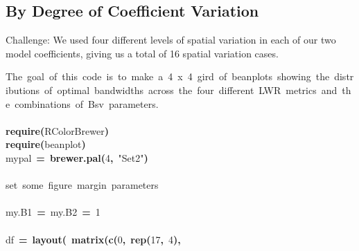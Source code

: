 \documentclass{article}
\makeatletter
\newcommand{\hlnumber}[1]{\textcolor[rgb]{0,0,0}{#1}}%
\newcommand{\hlfunctioncall}[1]{\textcolor[rgb]{0.501960784313725,0,0.329411764705882}{\textbf{#1}}}%
\newcommand{\hlstring}[1]{\textcolor[rgb]{0.6,0.6,1}{#1}}%
\newcommand{\hlkeyword}[1]{\textcolor[rgb]{0,0,0}{\textbf{#1}}}%
\newcommand{\hlcomment}[1]{\textcolor[rgb]{0.180392156862745,0.6,0.341176470588235}{#1}}%
\newcommand{\hlassignement}[1]{\textcolor[rgb]{0,0,0}{\textbf{#1}}}%
\newcommand{\hlsymbol}[1]{\textcolor[rgb]{0,0,0}{#1}}%
\newcommand{\hlstd}[1]{\textcolor[rgb]{0,0,0}{#1}}%
\newenvironment{kframe}{%
 \def\FrameCommand##1{\hskip\@totalleftmargin \hskip-\fboxsep
 \colorbox{shadecolor}{##1}\hskip-\fboxsep
     \hskip-\linewidth \hskip-\@totalleftmargin \hskip\columnwidth}%
 \MakeFramed {\advance\hsize-\width
   \@totalleftmargin\z@ \linewidth\hsize
   \@setminipage}}%
 {\par\unskip\endMakeFramed}
\newenvironment{knitrout}{}{} %
\makeatother
\begin{document}
\subsection{By Degree of Coefficient Variation}

Challenge: We used four different levels of spatial variation in each of our two model coefficients, giving us a total of 16 spatial variation cases.

\begin{knitrout}
\color{fgcolor}\begin{kframe}
\begin{flushleft}
\ttfamily\noindent
\hlcomment{\usebox{\hlnormalsizeboxhash}{\ }The{\ }goal{\ }of{\ }this{\ }code{\ }is{\ }to{\ }make{\ }a{\ }4{\ }x{\ }4{\ }gird{\ }of{\ }beanplots{\ }showing{\ }the{\ }distributions{\ }of{\ }optimal{\ }bandwidths{\ }across{\ }the{\ }four{\ }different{\ }LWR{\ }metrics{\ }and{\ }the{\ }combinations{\ }of{\ }Bsv{\ }parameters.{\ }}\hspace*{\fill}\\
\hlstd{}\hspace*{\fill}\\
\hlstd{}\hlfunctioncall{require}\hlkeyword{(}\hlsymbol{RColorBrewer}\hlkeyword{)}\hspace*{\fill}\\
\hlstd{}\hlfunctioncall{require}\hlkeyword{(}\hlsymbol{beanplot}\hlkeyword{)}\hspace*{\fill}\\
\hlstd{}\hlsymbol{mypal}{\ }\hlassignement{=}{\ }\hlfunctioncall{brewer.pal}\hlkeyword{(}\hlnumber{4}\hlkeyword{,}{\ }\hlstring{"{}Set2"{}}\hlkeyword{)}\hspace*{\fill}\\
\hlstd{}\hspace*{\fill}\\
\hlstd{}\hlcomment{\usebox{\hlnormalsizeboxhash}{\ }set{\ }some{\ }figure{\ }margin{\ }parameters}\hspace*{\fill}\\
\hlstd{}\hspace*{\fill}\\
\hlstd{}\hlsymbol{my.B1}{\ }\hlassignement{=}{\ }\hlsymbol{my.B2}{\ }\hlassignement{=}{\ }\hlnumber{1}\hspace*{\fill}\\
\hlstd{}\hspace*{\fill}\\
\hlstd{}\hlsymbol{df}{\ }\hlassignement{=}{\ }\hlfunctioncall{layout}\hlkeyword{(}{\ }\hlfunctioncall{matrix}\hlkeyword{(}\hlfunctioncall{c}\hlkeyword{(}\hlnumber{0}\hlkeyword{,}{\ }\hlfunctioncall{rep}\hlkeyword{(}\hlnumber{17}\hlkeyword{,}{\ }\hlnumber{4}\hlkeyword{)}\hlkeyword{,}\hspace*{\fill}\\

\end{flushleft}
\end{kframe}
\end{knitrout}
\end{document}
